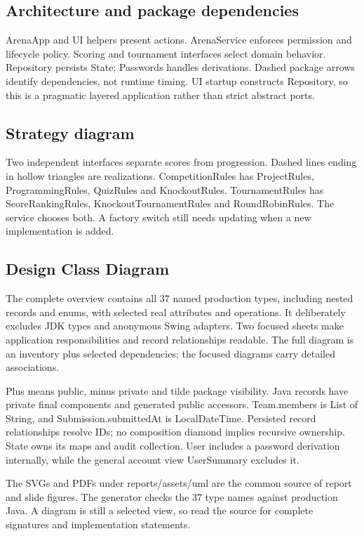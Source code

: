\documentclass[12pt]{article}
\begin{document}
\subsection{Architecture and package dependencies}
ArenaApp and UI helpers present actions. ArenaService enforces permission and lifecycle policy. Scoring and tournament interfaces select domain behavior. Repository persists State; Passwords handles derivations. Dashed package arrows identify dependencies, not runtime timing. UI startup constructs Repository, so this is a pragmatic layered application rather than strict abstract ports.
\subsection{Strategy diagram}
Two independent interfaces separate scores from progression. Dashed lines ending in hollow triangles are realizations. CompetitionRules has ProjectRules, ProgrammingRules, QuizRules and KnockoutRules. TournamentRules has ScoreRankingRules, KnockoutTournamentRules and RoundRobinRules. The service chooses both. A factory switch still needs updating when a new implementation is added.
\subsection{Design Class Diagram}
The complete overview contains all 37 named production types, including nested records and enums, with selected real attributes and operations. It deliberately excludes JDK types and anonymous Swing adapters. Two focused sheets make application responsibilities and record relationships readable. The full diagram is an inventory plus selected dependencies; the focused diagrams carry detailed associations.

Plus means public, minus private and tilde package visibility. Java records have private final components and generated public accessors. Team.members is List of String, and Submission.submittedAt is LocalDateTime. Persisted record relationships resolve IDs; no composition diamond implies recursive ownership. State owns its maps and audit collection. User includes a password derivation internally, while the general account view UserSummary excludes it.

The SVGs and PDFs under reports/assets/uml are the common source of report and slide figures. The generator checks the 37 type names against production Java. A diagram is still a selected view, so read the source for complete signatures and implementation statements.
\end{document}

